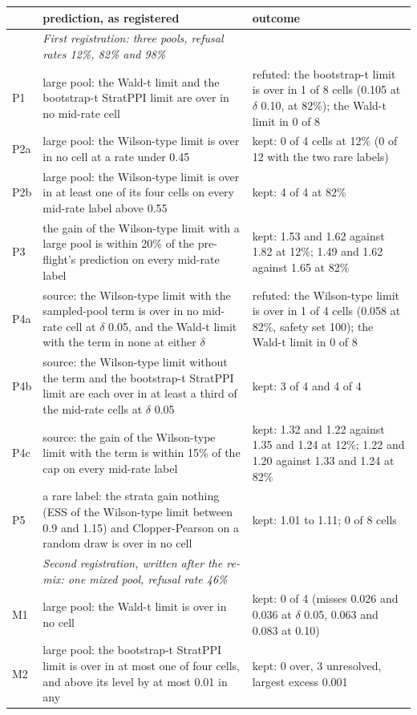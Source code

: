 \begin{tabular}{@{}l p{7.4cm} p{7.4cm}@{}}
\toprule
 & \textbf{prediction, as registered} & \textbf{outcome} \\
\midrule
 & \emph{First registration: three pools, refusal rates 12\%, 82\% and 98\%} &  \\
P1 & large pool: the Wald-t limit and the bootstrap-t StratPPI limit are over in no mid-rate cell & refuted: the bootstrap-t limit is over in 1 of 8 cells (0.105 at $\delta$ 0.10, at 82\%); the Wald-t limit in 0 of 8 \\
P2a & large pool: the Wilson-type limit is over in no cell at a rate under 0.45 & kept: 0 of 4 cells at 12\% (0 of 12 with the two rare labels) \\
P2b & large pool: the Wilson-type limit is over in at least one of its four cells on every mid-rate label above 0.55 & kept: 4 of 4 at 82\% \\
P3 & the gain of the Wilson-type limit with a large pool is within 20\% of the pre-flight's prediction on every mid-rate label & kept: 1.53 and 1.62 against 1.82 at 12\%; 1.49 and 1.62 against 1.65 at 82\% \\
P4a & source: the Wilson-type limit with the sampled-pool term is over in no mid-rate cell at $\delta$ 0.05, and the Wald-t limit with the term in none at either $\delta$ & refuted: the Wilson-type limit is over in 1 of 4 cells (0.058 at 82\%, safety set 100); the Wald-t limit in 0 of 8 \\
P4b & source: the Wilson-type limit without the term and the bootstrap-t StratPPI limit are each over in at least a third of the mid-rate cells at $\delta$ 0.05 & kept: 3 of 4 and 4 of 4 \\
P4c & source: the gain of the Wilson-type limit with the term is within 15\% of the cap on every mid-rate label & kept: 1.32 and 1.22 against 1.35 and 1.24 at 12\%; 1.22 and 1.20 against 1.33 and 1.24 at 82\% \\
P5 & a rare label: the strata gain nothing (ESS of the Wilson-type limit between 0.9 and 1.15) and Clopper-Pearson on a random draw is over in no cell & kept: 1.01 to 1.11; 0 of 8 cells \\
 & \emph{Second registration, written after the re-mix: one mixed pool, refusal rate 46\%} &  \\
M1 & large pool: the Wald-t limit is over in no cell & kept: 0 of 4 (misses 0.026 and 0.036 at $\delta$ 0.05, 0.063 and 0.083 at 0.10) \\
M2 & large pool: the bootstrap-t StratPPI limit is over in at most one of four cells, and above its level by at most 0.01 in any & kept: 0 over, 3 unresolved, largest excess 0.001 \\

\end{tabular}
